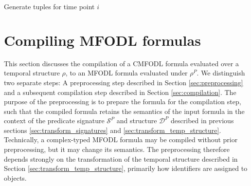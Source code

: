\begin{algorithm}
	\LinesNumbered
	\label{code:gen_tuples}
	\caption{Generate tuples for time point $i$}
\end{algorithm}


\section{Compiling MFODL formulas}
\label{sec:compile_mfodl}

This section discusses the compilation of a CMFODL formula evaluated over a temporal structure $\rho$, to an MFODL formula evaluated under $\rho^P$. We distinguish two separate steps: A preprocessing step described in Section \ref{sec:preprocessing} and a subsequent compilation step described in Section \ref{sec:compilation}. The purpose of the preprocessing is to prepare the formula for the compilation step, such that the compiled formula retains the semantics of the input formula in the context of the predicate signature $\mathcal{S}^P$ and structure $\mathcal{D}^P$ described in previous sections \ref{sec:transform_signatures} and \ref{sec:transform_temp_structure}. Technically, a complex-typed MFODL formula may be compiled without prior preprocessing, but it may change its semantics. The preprocessing therefore depends strongly on the transformation of the temporal structure described in Section \ref{sec:transform_temp_structure}, primarily how identifiers are assigned to objects.

